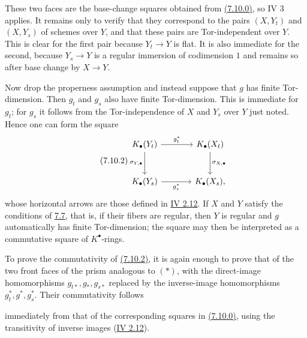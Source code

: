 These two faces are the base-change squares obtained from \hyperlink{sga6.e10.eq.7-10-0}{(7.10.0)}, so IV 3
applies. It remains only to verify that they correspond to the pairs
$(X,Y_t)$ and $(X,Y_s)$ of schemes over $Y$, and that these pairs are
Tor-independent over $Y$. This is clear for the first pair because
$Y_t\to Y$ is flat. It is also immediate for the second, because
$Y_s\to Y$ is a regular immersion of codimension $1$ and remains so after
base change by $X\to Y$.

Now drop the properness assumption and instead suppose that $g$ has finite
Tor-dimension. Then $g_t$ and $g_s$ also have finite Tor-dimension. This is
immediate for $g_t$; for $g_s$ it follows from the Tor-independence of
$X$ and $Y_s$ over $Y$ just noted. Hence one can form the square
\begin{equation}\tag{7.10.2}
\begin{tikzcd}[column sep=large,row sep=large]
K_\bullet(Y_t) \arrow[r,"g_t^*"] \arrow[d,"\sigma_{Y,\bullet}"'] &
K_\bullet(X_t) \arrow[d,"\sigma_{X,\bullet}"]\\
K_\bullet(Y_s) \arrow[r,"g_s^*"'] & K_\bullet(X_s),
\end{tikzcd}
\end{equation}
whose horizontal arrows are those defined in \hyperlink{sga6.e04.para.2-12}{IV 2.12}. If $X$ and $Y$
satisfy the conditions of \hyperlink{sga6.e10.sec.7.7}{7.7}, that is, if their fibers are regular, then
$Y$ is regular and $g$ automatically has finite Tor-dimension; the square
may then be interpreted as a commutative square of $K^\bullet$-rings.

To prove the commutativity of \hyperlink{sga6.e10.eq.7-10-2}{(7.10.2)}, it is again enough to prove that of
the two front faces of the prism analogous to $(*)$, with the direct-image
homomorphisms $g_{t*},g_*,g_{s*}$ replaced by the inverse-image
homomorphisms $g_t^*,g^*,g_s^*$. Their commutativity follows

immediately from that of the corresponding squares in \hyperlink{sga6.e10.eq.7-10-0}{(7.10.0)}, using the
transitivity of inverse images (\hyperlink{sga6.e04.para.2-12}{IV 2.12}).

